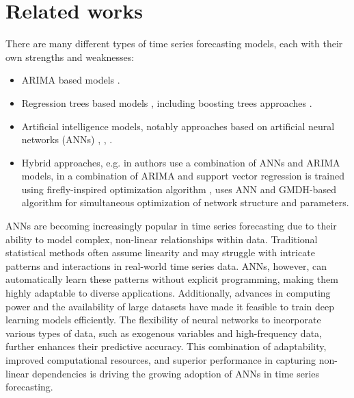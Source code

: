 \documentclass[sn-apa]{sn-jnl}%
\begin{document}
\section{Related works}\label{sec2}

There are many different types of time series forecasting models, each with their own strengths and weaknesses:

\begin{itemize}
\item ARIMA based models \citep{box2015time}.
\item Regression trees based models \citep{breiman2017classification}, including boosting trees approaches \citep{chen2016xgboost}.
\item Artificial intelligence models, notably approaches based on artificial neural networks (ANNs) \citep{tealab2018time}, \citep{sineglazov2014using}, \citep{sineglazov2013algorithm}.
\item Hybrid approaches, e.g. in \citep{fawzy2022comparative} authors use a combination of ANNs and ARIMA models, in \citep{ngo2022developing} a combination of ARIMA and support vector regression \citep{awad2015support} is trained using firefly-inspired optimization algorithm \citep{fister2013comprehensive}, \citep{sineglazov2018forecasting} uses ANN and GMDH-based \citep{ivakhnenko1995review} algorithm for simultaneous optimization of network structure and parameters.
\end{itemize}

ANNs are becoming increasingly popular in time series forecasting due to their ability to model complex, non-linear relationships within data. Traditional statistical methods often assume linearity and may struggle with intricate patterns and interactions in real-world time series data. ANNs, however, can automatically learn these patterns without explicit programming, making them highly adaptable to diverse applications. Additionally, advances in computing power and the availability of large datasets have made it feasible to train deep learning models efficiently. The flexibility of neural networks to incorporate various types of data, such as exogenous variables and high-frequency data, further enhances their predictive accuracy. This combination of adaptability, improved computational resources, and superior performance in capturing non-linear dependencies is driving the growing adoption of ANNs in time series forecasting.
\end{document}
